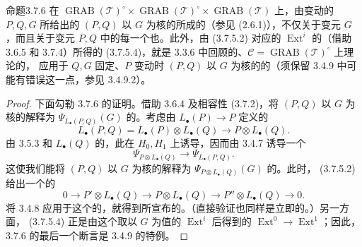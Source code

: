 \begin{SGAresult}{命题}{3.7.6}
在 $\operatorname{GRAB}(\mathcal T)^\circ\times\operatorname{GRAB}(\mathcal T)^\circ\times\operatorname{GRAB}(\mathcal T)$ 上，由变动的 $P,Q,G$ 所给出的 $(P,Q)$ 以 $G$ 为核的所成的（参见 (2.6.1)），不仅关于变元 $G$ ，而且关于变元 $P,Q$ 中的每一个也。此外，由 (3.7.5.2) 对应的 $\operatorname{Ext}^i$ 的（借助 3.6.5 和 3.7.4）所得的 (3.7.5.4)，就是 3.3.6 中回顾的、$\mathcal C=\operatorname{GRAB}(\mathcal T)^\circ$ 上理论的，
应用于 $Q,G$ 固定、$P$ 变动时 $(P,Q)$ 以 $G$ 为核的的（须保留 3.4.9 中可能有错误这一点，参见 3.4.9.2）。
\end{SGAresult}
\begin{proof}
下面勾勒 3.7.6 的证明。借助 3.6.4 及相容性 (3.7.2)，将 $(P,Q)$ 以 $G$ 为核的解释为 $\Psi_{L_\bullet(P,Q)}(G)$ 的。考虑由 $L_\bullet(P)\to P$ 定义的
\[
L_\bullet(P,Q)=L_\bullet(P)\otimes L_\bullet(Q)\longrightarrow P\otimes L_\bullet(Q).
\]
由 3.5.3 和 $L_\bullet(Q)$ 的，此在 $H_0,H_1$ 上诱导，因而由 3.4.7 诱导一个
\[
\Psi_{P\otimes L_\bullet(Q)}\longrightarrow\Psi_{L_\bullet(P,Q)}.
\]
这使我们能将 $(P,Q)$ 以 $G$ 为核的解释为 $\Psi_{P\otimes L_\bullet(Q)}(G)$ 的。此时， (3.7.5.2) 给出一个的
\[
0\longrightarrow P'\otimes L_\bullet(Q)\longrightarrow P\otimes L_\bullet(Q)
\longrightarrow P''\otimes L_\bullet(Q)\longrightarrow0.\tag{3.7.6.1}
\]
将 3.4.8 应用于这个的，就得到所宣布的。（直接验证也同样是立即的。）另一方面， (3.7.5.4) 正是由这个取以 $G$ 为值的 $\operatorname{Ext}^i$ 后得到的 $\operatorname{Ext}^0\to\operatorname{Ext}^1$；因此，3.7.6 的最后一个断言是 3.4.9 的特例。
\end{proof}

